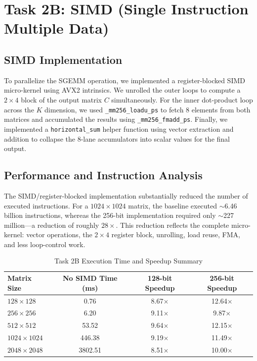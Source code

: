 
\section{Task 2B: SIMD (Single Instruction Multiple Data)}

\subsection{SIMD Implementation}
To parallelize the SGEMM operation, we implemented a register-blocked SIMD micro-kernel using AVX2 intrinsics. We unrolled the outer loops to compute a $2 \times 4$ block of the output matrix $C$ simultaneously. For the inner dot-product loop across the $K$ dimension, we used \texttt{\_mm256\_loadu\_ps} to fetch 8 elements from both matrices and accumulated the results using \texttt{\_mm256\_fmadd\_ps}. Finally, we implemented a \texttt{horizontal\_sum} helper function using vector extraction and addition to collapse the 8-lane accumulators into scalar values for the final output. 

\subsection{Performance and Instruction Analysis}

The SIMD/register-blocked implementation substantially reduced the number of executed instructions. For a $1024 \times 1024$ matrix, the baseline executed $\sim$6.46 billion instructions, whereas the 256-bit implementation required only $\sim$227 million---a reduction of roughly $28\times$. This reduction reflects the complete micro-kernel: vector operations, the $2 \times 4$ register block, unrolling, load reuse, FMA, and less loop-control work.

\begin{table}[H]
\centering
\caption{Task 2B Execution Time and Speedup Summary}
\begin{tabular}{lccc}
\toprule
Matrix Size & No SIMD Time (ms) & 128-bit Speedup & 256-bit Speedup \\
\midrule
$128 \times 128$ & 0.76 & 8.67$\times$ & 12.64$\times$ \\
$256 \times 256$ & 6.20 & 9.11$\times$ & 9.87$\times$ \\
$512 \times 512$ & 53.52 & 9.64$\times$ & 12.15$\times$ \\
$1024 \times 1024$ & 446.38 & 9.19$\times$ & 11.49$\times$ \\
$2048 \times 2048$ & 3802.51 & 8.51$\times$ & 10.00$\times$ \\
\bottomrule
\end{tabular}
\end{table}

